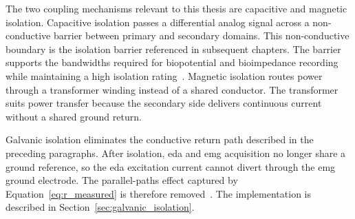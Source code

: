 The two coupling mechanisms relevant to this thesis are capacitive and magnetic isolation. Capacitive isolation passes a differential analog signal across a non-conductive barrier between primary and secondary domains. This non-conductive boundary is the isolation barrier referenced in subsequent chapters. The barrier supports the bandwidths required for biopotential and bioimpedance recording while maintaining a high isolation rating~\cite{webster_medical_2020}. Magnetic isolation routes power through a transformer winding instead of a shared conductor. The transformer suits power transfer because the secondary side delivers continuous current without a shared ground return.


Galvanic isolation eliminates the conductive return path described in the preceding paragraphs. After isolation, \gls{eda} and \gls{emg} acquisition no longer share a ground reference, so the \gls{eda} excitation current cannot divert through the \gls{emg} ground electrode. The parallel-paths effect captured by Equation~\ref{eq:r_measured} is therefore removed~\cite{kusche_galvanically_2017}. The implementation is described in Section~\ref{sec:galvanic_isolation}.

